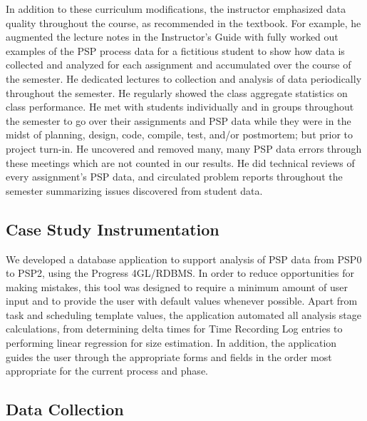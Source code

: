   In addition to these curriculum modifications, the instructor
  emphasized data quality throughout the course, as recommended in the
  textbook.  For example, he augmented the lecture notes in the
  Instructor's Guide with fully worked out examples of the PSP process data
  for a fictitious student to show how data is collected and analyzed for
  each assignment and accumulated over the course of the semester.  He
  dedicated lectures to collection and analysis of data periodically
  throughout the semester. He regularly showed the class aggregate
  statistics on class performance.  He met with students individually and
  in groups throughout the semester to go over their assignments and PSP
  data while they were in the midst of planning, design, code, compile,
  test, and/or postmortem; but prior to project turn-in.  He uncovered and
  removed many, many PSP data errors through these meetings which are not
  counted in our results.  He did technical reviews of every assignment's
  PSP data, and circulated problem reports throughout the semester
  summarizing issues discovered from student data.

\subsection{Case Study Instrumentation}
  
We developed a database application to support analysis of PSP data from
PSP0 to PSP2, using the Progress 4GL/RDBMS.  In order to reduce
opportunities for making mistakes, this tool was designed to require a
minimum amount of user input and to provide the user with default values
whenever possible.  Apart from task and scheduling template values, the
application automated all analysis stage calculations, from determining
delta times for Time Recording Log entries to performing linear regression
for size estimation. In addition, the application guides the user through
the appropriate forms and fields in the order most appropriate for the
current process and phase.
 
\subsection{Data Collection}
  
